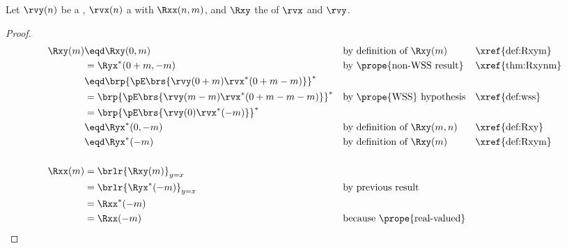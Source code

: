 \begin{corollary}
\label{cor:Rxxm}
\label{cor:Rxym}
Let $\rvy(n)$ be a ,
    $\rvx(n)$    a  with  $\Rxx(n,m)$,
and $\Rxy$    the  of $\rvx$ and $\rvy$.
\end{corollary}
\begin{proof}
\begin{align*}
  \Rxy(m)
     &\eqd \Rxy(0,m)
     && \text{by definition of $\Rxy(m)$}
     && \text{\xref{def:Rxym}}
   \\&= \Ryx^\ast(0+m,-m)
     && \text{by \prope{non-WSS result}}
     && \text{\xref{thm:Rxynm}}
   \\&\eqd \brp{\pE\brs{\rvy(0+m) \rvx^\ast(0+m-m)}}^\ast
   \\&=    \brp{\pE\brs{\rvy(m-m) \rvx^\ast(0+m-m-m)}}^\ast
     && \text{by \prope{WSS} hypothesis}
     && \text{\xref{def:wss}}
   \\&=    \brp{\pE\brs{\rvy(0) \rvx^\ast(-m)}}^\ast
   \\&\eqd \Ryx^\ast(0,-m)
     && \text{by definition of $\Rxy(m,n)$}
     && \text{\xref{def:Rxy}}
   \\&\eqd \Ryx^\ast(-m)
     && \text{by definition of $\Rxy(m)$}
     && \text{\xref{def:Rxym}}
   \\
   \\
   \Rxx(m)
     &= \brlr{\Rxy(m)}_{y=x}
   \\&= \brlr{\Ryx^\ast(-m)}_{y=x}
     && \text{by previous result}
   \\&= \Rxx^\ast(-m)
   \\&= \Rxx(-m)
     && \text{because \prope{real-valued}}
\end{align*}
\end{proof}


